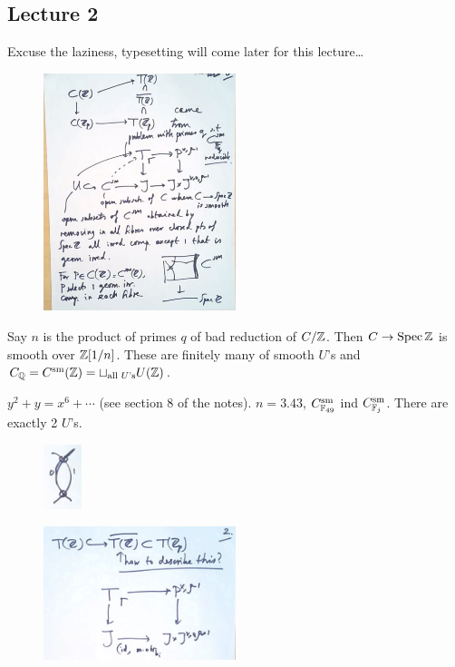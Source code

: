 \newpage
\subsection{Lecture 2}


Excuse the laziness, typesetting will come later for this lecture\dots

	\begin{figure}[!ht]
	\centering
	\includegraphics[width=0.5\textwidth]{../images/im12.png}
	\end{figure}


Say $n$ is the product of primes $q$ of bad reduction of $C/\mathbb{Z}$. Then $C \to \operatorname{Spec} \mathbb{Z}$ is smooth over $\mathbb{Z}[1/n]$. These are finitely many of smooth $U$'s and $C_{\mathbb{Q}}= C^\text{sm}(\mathbb{Z})= \sqcup_{\text{all }U\text{'s}} U(\mathbb{Z})$.


\begin{ex}
$y^2+y= x^6 + \cdots$ (see section 8 of the notes). $n=3.43$, $C_{\mathbb{F}_{49}}^\text{sm}$ ind $C_{\mathbb{F}_j}^\text{sm}$. There are exactly 2 $U$'s.
	\begin{figure}[!ht]
	\centering
	\includegraphics[width=0.1\textwidth]{../images/im13.png}
	\end{figure}
\end{ex}


	\begin{figure}[!ht]
	\centering
	\includegraphics[width=0.5\textwidth]{../images/im14.png}
	\end{figure}


